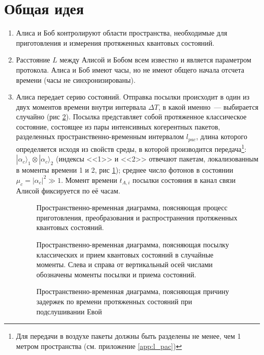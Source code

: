 \section[Общая схема протокола]{Общая идея}

\begin{enumerate}
  \item Алиса и Боб контролируют области пространства, необходимые для приготовления и измерения протяженных квантовых состояний.
  \item Расстояние $L$ между Алисой и Бобом всем известно и является параметром протокола. Алиса и Боб имеют часы, но не имеют общего начала отсчета времени (часы не синхронизированы).
  \item Алиса передает серию состояний. Отправка посылки происходит в один из двух моментов времени внутри интервала $\Delta T$, в какой именно~--- выбирается случайно (рис \ref{fig:timeline}). 
  Посылка представляет собой протяженное классическое состояние, состоящее из пары интенсивных когерентных пакетов, разделенных пространственно-временным интервалом $l_{pac}$, длина которого определяется исходя из свойств среды, в которой производится передача\footnote{Для передачи в воздухе пакеты должны быть разделены не менее, чем 1 метром пространства (см. приложение \ref{app:l_pac})}: 
  $|\alpha_c\rangle_1 \otimes|\alpha_c\rangle_2$ (индексы <<1>> и <<2>> отвечают пакетам, локализованным в моменты времени 1 и 2, рис \ref{fig:process}); среднее число фотонов в состоянии $\mu_c = |\alpha_c|^2 \gg 1$. 
  Момент времени $t_{A,i}$ посылки состояния в канал связи Алисой фиксируется по её часам.
  
  \begin{figure}[h]
  \caption{Пространственно-временная диаграмма, поясняющая процесс приготовления, преобразования и распространения протяженных квантовых состояний.}
  \label{fig:process}
  \end{figure}
  \begin{figure}[h]
  \caption{Пространственно-временная диаграмма, поясняющая посылку классических и прием квантовых состояний в случайные моменты. Слева и справа от вертикальный осей числами обозначены моменты посылки и приема состояний. }
  \label{fig:timeline}
  \end{figure}
  \begin{figure}[h]
  \caption{Пространственно-временная диаграмма, поясняющая причину задержек по времени протяженных состояний при подслушивании Евой}
  \label{fig:detected}
  \end{figure}
  

\end{enumerate}
